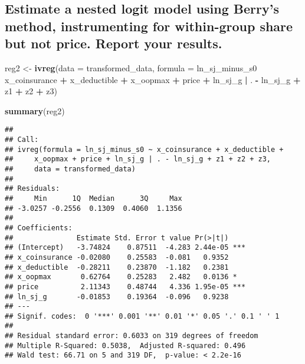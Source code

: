 \documentclass[]{article}
\newenvironment{Shaded}{\begin{snugshade}}{\end{snugshade}}
\newcommand{\DataTypeTok}[1]{\textcolor[rgb]{0.13,0.29,0.53}{#1}}
\newcommand{\KeywordTok}[1]{\textcolor[rgb]{0.13,0.29,0.53}{\textbf{#1}}}
\newcommand{\NormalTok}[1]{#1}
\newcommand{\OperatorTok}[1]{\textcolor[rgb]{0.81,0.36,0.00}{\textbf{#1}}}
\newcommand{\StringTok}[1]{\textcolor[rgb]{0.31,0.60,0.02}{#1}}
\begin{document}
\hypertarget{estimate-a-nested-logit-model-using-berrys-method-instrumenting-for-within-group-share-but-not-price.-report-your-results.}{%
\subsection{Estimate a nested logit model using Berry's method,
instrumenting for within-group share but not price. Report your
results.}\label{estimate-a-nested-logit-model-using-berrys-method-instrumenting-for-within-group-share-but-not-price.-report-your-results.}}

\begin{Shaded}
\begin{Highlighting}[]
\NormalTok{reg2 <-}\StringTok{ }\KeywordTok{ivreg}\NormalTok{(}\DataTypeTok{data =}\NormalTok{ transformed_data, }
      \DataTypeTok{formula =}\NormalTok{ ln_sj_minus_s0 }\OperatorTok{~}\StringTok{ }\NormalTok{x_coinsurance }\OperatorTok{+}\StringTok{ }\NormalTok{x_deductible }\OperatorTok{+}\StringTok{ }\NormalTok{x_oopmax }\OperatorTok{+}\StringTok{ }\NormalTok{price }\OperatorTok{+}\StringTok{ }\NormalTok{ln_sj_g }\OperatorTok{|}\StringTok{ }\NormalTok{. }\OperatorTok{-}\StringTok{ }\NormalTok{ln_sj_g }\OperatorTok{+}\StringTok{ }\NormalTok{z1 }\OperatorTok{+}\StringTok{ }\NormalTok{z2 }\OperatorTok{+}\StringTok{ }\NormalTok{z3)}

\KeywordTok{summary}\NormalTok{(reg2)}
\end{Highlighting}
\end{Shaded}

\begin{verbatim}
## 
## Call:
## ivreg(formula = ln_sj_minus_s0 ~ x_coinsurance + x_deductible + 
##     x_oopmax + price + ln_sj_g | . - ln_sj_g + z1 + z2 + z3, 
##     data = transformed_data)
## 
## Residuals:
##     Min      1Q  Median      3Q     Max 
## -3.0257 -0.2556  0.1309  0.4060  1.1356 
## 
## Coefficients:
##               Estimate Std. Error t value Pr(>|t|)    
## (Intercept)   -3.74824    0.87511  -4.283 2.44e-05 ***
## x_coinsurance -0.02080    0.25583  -0.081   0.9352    
## x_deductible  -0.28211    0.23870  -1.182   0.2381    
## x_oopmax       0.62764    0.25283   2.482   0.0136 *  
## price          2.11343    0.48744   4.336 1.95e-05 ***
## ln_sj_g       -0.01853    0.19364  -0.096   0.9238    
## ---
## Signif. codes:  0 '***' 0.001 '**' 0.01 '*' 0.05 '.' 0.1 ' ' 1
## 
## Residual standard error: 0.6033 on 319 degrees of freedom
## Multiple R-Squared: 0.5038,  Adjusted R-squared: 0.496 
## Wald test: 66.71 on 5 and 319 DF,  p-value: < 2.2e-16
\end{verbatim}
\end{document}
